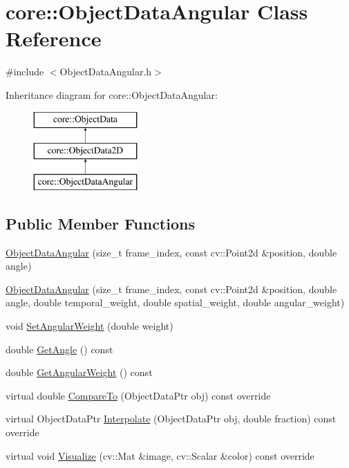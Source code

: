 \hypertarget{classcore_1_1ObjectDataAngular}{}\section{core\+:\+:Object\+Data\+Angular Class Reference}
\label{classcore_1_1ObjectDataAngular}


{\ttfamily \#include $<$Object\+Data\+Angular.\+h$>$}

Inheritance diagram for core\+:\+:Object\+Data\+Angular\+:\begin{figure}[H]
\begin{center}
\leavevmode
\includegraphics[height=3.000000cm]{classcore_1_1ObjectDataAngular}
\end{center}
\end{figure}
\subsection*{Public Member Functions}
\begin{DoxyCompactItemize}
\item 
\hyperlink{classcore_1_1ObjectDataAngular_a276b02fc7646e3275f1cb81fca7e9a47}{Object\+Data\+Angular} (size\+\_\+t frame\+\_\+index, const cv\+::\+Point2d \&position, double angle)
\item 
\hyperlink{classcore_1_1ObjectDataAngular_aae3a8f335e26771d06c8940931d5d654}{Object\+Data\+Angular} (size\+\_\+t frame\+\_\+index, const cv\+::\+Point2d \&position, double angle, double temporal\+\_\+weight, double spatial\+\_\+weight, double angular\+\_\+weight)
\item 
void \hyperlink{classcore_1_1ObjectDataAngular_af6772caef2337f3c12a3f52049c4d853}{Set\+Angular\+Weight} (double weight)
\item 
double \hyperlink{classcore_1_1ObjectDataAngular_a6c2da5010cd919af3b0f156579d04ef8}{Get\+Angle} () const
\item 
double \hyperlink{classcore_1_1ObjectDataAngular_ae1c5db7b9fc06e648450d9388c93a1aa}{Get\+Angular\+Weight} () const
\item 
virtual double \hyperlink{classcore_1_1ObjectDataAngular_a2932240c6c082b76f2c04723cdf3e4f9}{Compare\+To} (Object\+Data\+Ptr obj) const override
\item 
virtual Object\+Data\+Ptr \hyperlink{classcore_1_1ObjectDataAngular_a42962dd1f994b2577133450e755d586e}{Interpolate} (Object\+Data\+Ptr obj, double fraction) const override
\item 
virtual void \hyperlink{classcore_1_1ObjectDataAngular_acb4265f6de511238460df118148bc85c}{Visualize} (cv\+::\+Mat \&image, cv\+::\+Scalar \&color) const override
\end{DoxyCompactItemize}


